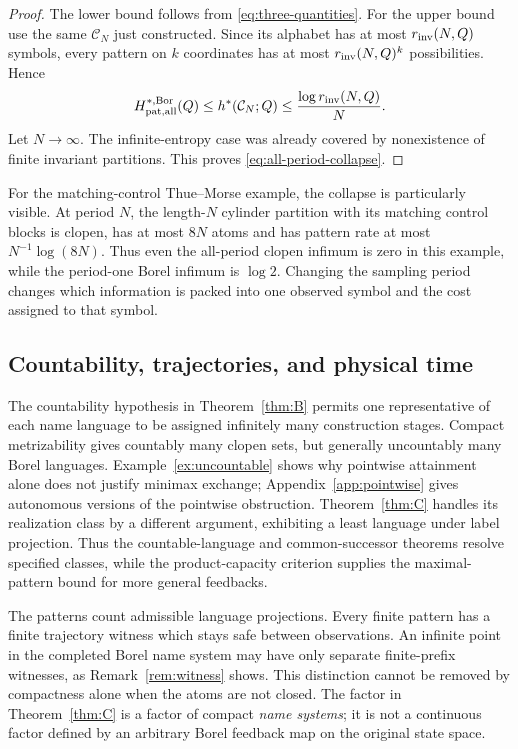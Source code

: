 \documentclass[11pt,reqno]{amsart}
\numberwithin{equation}{section}
\theoremstyle{definition}
\newcommand{\C}{\mathcal C}
\newcommand{\hpat}{h^{*}}
\newcommand{\Bor}{\mathrm{Bor}}
\begin{document}
\begin{proof}
The lower bound follows from
\eqref{eq:three-quantities}. For the upper bound use the same
$\C_N$ just constructed. Since its alphabet has at most
$r_{\rm inv}(N,Q)$ symbols, every pattern on $k$ coordinates has at most
$r_{\rm inv}(N,Q)^k$ possibilities. Hence
\begin{align*}
 H_{\rm pat,all}^{*,\Bor}(Q)
 \le\hpat(\C_N;Q)
 \le\frac{\log r_{\rm inv}(N,Q)}{N}.
\end{align*}
Let $N\to\infty$. The infinite-entropy case was already covered by
nonexistence of finite invariant partitions. This proves
\eqref{eq:all-period-collapse}.
\end{proof}

For the matching-control Thue--Morse example, the collapse is particularly
visible. At period $N$, the length-$N$ cylinder partition with its matching
control blocks is clopen, has at most $8N$ atoms and has pattern rate at
most $N^{-1}\log(8N)$. Thus even the all-period clopen infimum is zero
in this example, while the period-one Borel infimum is $\log2$.
Changing the sampling period changes which information is packed into
one observed symbol and the cost assigned to that symbol.

\subsection{Countability, trajectories, and physical time}
The countability hypothesis in Theorem~\ref{thm:B} permits one
representative of each name language to be assigned infinitely many
construction stages. Compact metrizability gives countably many
clopen sets, but generally uncountably many Borel languages.
Example~\ref{ex:uncountable} shows why pointwise attainment alone
does not justify minimax exchange; Appendix~\ref{app:pointwise}
gives autonomous versions of the pointwise obstruction.
Theorem~\ref{thm:C} handles its realization class by a different
argument, exhibiting a least language under label projection.
Thus the countable-language and common-successor theorems resolve
specified classes, while the product-capacity criterion supplies
the maximal-pattern bound for more general feedbacks.

The patterns count admissible language projections. Every finite pattern
has a finite trajectory witness which stays safe between observations.
An infinite point in the completed Borel name system may have only
separate finite-prefix witnesses, as Remark~\ref{rem:witness} shows.
This distinction cannot be removed by compactness alone when the atoms
are not closed. The factor in Theorem~\ref{thm:C} is a factor of compact
\emph{name systems}; it is not a continuous factor defined by an arbitrary
Borel feedback map on the original state space.
\end{document}
